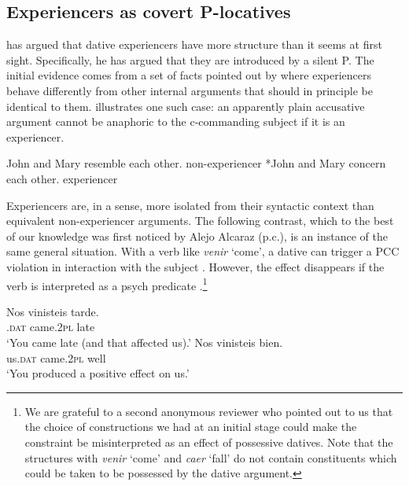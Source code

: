 \documentclass[output=paper,colorlinks,citecolor=brown,nonflat]{langsci/langscibook}
\begin{document}
\subsection{Experiencers as covert P-locatives}\label{sec:fabregas:3.2}

\citet{Landau2010} has argued that dative experiencers have more structure than it seems at first sight. Specifically, he has argued that they are introduced by a silent P. The initial evidence comes from a set of facts pointed out by \citeauthor{Landau2010} where experiencers behave differently from other internal arguments that should in principle be identical to them.  illustrates one such case: an apparently plain accusative argument cannot be anaphoric to the c-commanding subject if it is an experiencer.

\ea%
    \label{ex:fabregas:29}
    \ea\label{ex:fabregas:29a}
    John and Mary resemble each other. \hfill non-experiencer
    \ex\label{ex:fabregas:29b}
    *John and Mary concern each other. \hfill experiencer
    \z
\z

Experiencers are, in a sense, more isolated from their syntactic context than equivalent non-experiencer arguments. The following contrast, which to the best of our knowledge was first noticed by Alejo Alcaraz (p.c.), is an instance of the same general situation. With a verb like \textit{venir} `come', a dative can trigger a PCC violation in interaction with the subject . However, the effect disappears if the verb is interpreted as a psych predicate .\footnote{We are grateful to a second anonymous reviewer who pointed out to us that the choice of constructions we had at an initial stage could make the constraint be misinterpreted as an effect of possessive datives. Note that the structures with \textit{venir} `come' and \textit{caer} `fall' do not contain constituents which could be taken to be possessed by the dative argument.}

\ea%
    \label{ex:fabregas:30}
    \ea\label{ex:fabregas:30a}
    \gll    *Nos     vinisteis   tarde.\\
            \textsc{.dat}   {came.2}\textsc{pl}   {late}\\
    \glt    `You came late (and that affected us).'
    \ex\label{ex:fabregas:30b}
    \gll    Nos     vinisteis     bien.\\
            {us}\textsc{.dat}  {came.2}\textsc{pl}   {well}\\
    \glt `You produced a positive effect on us.'
    \z
\z
\end{document}
